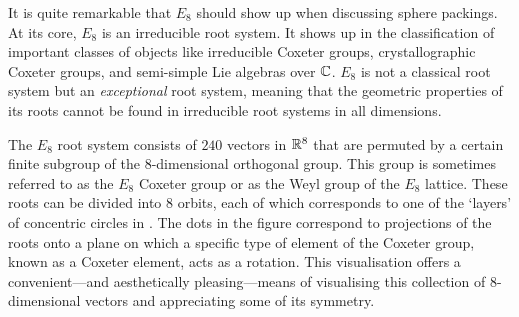 It is quite remarkable that $E_8$ should show up when discussing sphere packings. At its core, $E_8$ is an irreducible root system. It shows up in the classification of important classes of objects like irreducible Coxeter groups, crystallographic Coxeter groups, and semi-simple Lie algebras over $\mathbb{C}$. $E_8$ is not a classical root system but an \textit{exceptional} root system, meaning that the geometric properties of its roots cannot be found in irreducible root systems in all dimensions.

The $E_8$ root system consists of $240$ vectors in $\mathbb{R}^8$ that are permuted by a certain finite subgroup of the $8$-dimensional orthogonal group. This group is sometimes referred to as the $E_8$ Coxeter group or as the Weyl group of the $E_8$ lattice. These roots can be divided into $8$ orbits, each of which corresponds to one of the `layers' of concentric circles in . The dots in the figure correspond to projections of the roots onto a plane on which a specific type of element of the Coxeter group, known as a Coxeter element, acts as a rotation. This visualisation offers a convenient---and aesthetically pleasing---means of visualising this collection of $8$-dimensional vectors and appreciating some of its symmetry.




